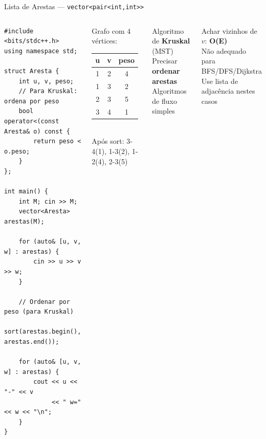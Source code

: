 \documentclass[aspectratio=169,10pt]{beamer}
\begin{document}
\begin{frame}[fragile]{Lista de Arestas --- \texttt{vector<pair<int,int>>}}
  \begin{columns}[t]
      \begin{tcolorbox}[caixaCodigo]
        \begin{lstlisting}[style=cppstyle]
#include <bits/stdc++.h>
using namespace std;

struct Aresta {
    int u, v, peso;
    // Para Kruskal: ordena por peso
    bool operator<(const Aresta& o) const {
        return peso < o.peso;
    }
};

int main() {
    int M; cin >> M;
    vector<Aresta> arestas(M);

    for (auto& [u, v, w] : arestas) {
        cin >> u >> v >> w;
    }

    // Ordenar por peso (para Kruskal)
    sort(arestas.begin(), arestas.end());

    for (auto& [u, v, w] : arestas) {
        cout << u << "-" << v
             << " w=" << w << "\n";
    }
}
        \end{lstlisting}
      \end{tcolorbox}
      \begin{tcolorbox}[caixaGrafo,title={Exemplo}]
        \footnotesize
        Grafo com 4 vértices:\\[3pt]
        \begin{tabular}{ccc}
          \textbf{u} & \textbf{v} & \textbf{peso}\\
          \hline
          1 & 2 & 4\\
          1 & 3 & 2\\
          2 & 3 & 5\\
          3 & 4 & 1\\
        \end{tabular}\\[5pt]
        Após sort: 3-4(1), 1-3(2), 1-2(4), 2-3(5)
      \end{tcolorbox}
      \vspace{0.07cm}
      \begin{tcolorbox}[caixaVerde,title={Quando usar}]
        \footnotesize
        Algoritmo de \textbf{Kruskal} (MST)\\
        Precisar \textbf{ordenar arestas}\\
        Algoritmos de fluxo simples
      \end{tcolorbox}
      \vspace{0.07cm}
      \begin{tcolorbox}[caixaVermelho,title={Desvantagem}]
        \footnotesize
        Achar vizinhos de $v$: \textbf{O(E)}\\
        Não adequado para BFS/DFS/Dijkstra\\
        Use lista de adjacência nestes casos
      \end{tcolorbox}
  \end{columns}
\end{frame}
\end{document}
